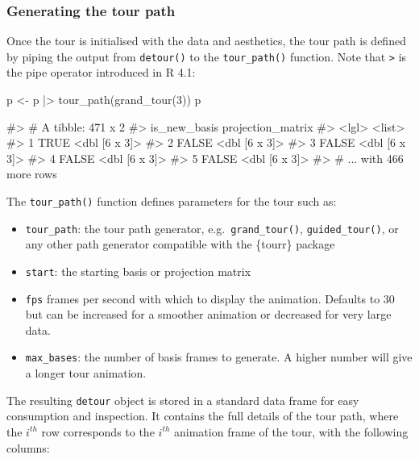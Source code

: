 \hypertarget{generating-the-tour-path}{%
\subsubsection{Generating the tour
path}\label{generating-the-tour-path}}

Once the tour is initialised with the data and aesthetics, the tour path
is defined by piping the output from \texttt{detour()} to the
\texttt{tour\_path()} function. Note that
\texttt{\textbar{}\textgreater{}} is the pipe operator introduced in R
4.1:

\pagebreak

\begin{Schunk}
\begin{Sinput}
p <- p |> tour_path(grand_tour(3))
p
\end{Sinput}
\begin{Soutput}
#> # A tibble: 471 x 2
#>   is_new_basis projection_matrix
#>   <lgl>        <list>           
#> 1 TRUE         <dbl [6 x 3]>    
#> 2 FALSE        <dbl [6 x 3]>    
#> 3 FALSE        <dbl [6 x 3]>    
#> 4 FALSE        <dbl [6 x 3]>    
#> 5 FALSE        <dbl [6 x 3]>    
#> # ... with 466 more rows
\end{Soutput}
\end{Schunk}

The \texttt{tour\_path()} function defines parameters for the tour such
as:

\begin{itemize}
\tightlist
\item
  \texttt{tour\_path}: the tour path generator,
  e.g.~\texttt{grand\_tour()}, \texttt{guided\_tour()}, or any other
  path generator compatible with the \{tourr\} package
\item
  \texttt{start}: the starting basis or projection matrix
\item
  \texttt{fps} frames per second with which to display the animation.
  Defaults to 30 but can be increased for a smoother animation or
  decreased for very large data.
\item
  \texttt{max\_bases}: the number of basis frames to generate. A higher
  number will give a longer tour animation.
\end{itemize}

The resulting \texttt{detour} object is stored in a standard data frame
for easy consumption and inspection. It contains the full details of the
tour path, where the \(i^{th}\) row corresponds to the \(i^{th}\)
animation frame of the tour, with the following columns:

